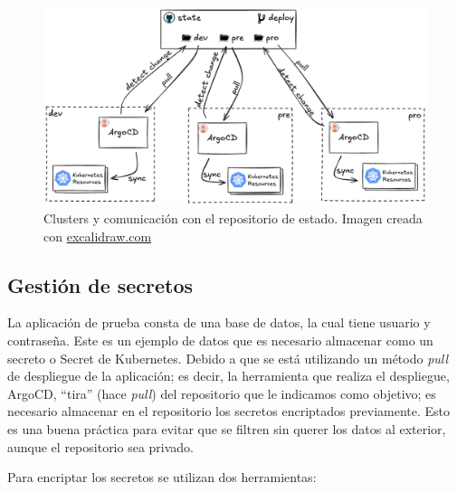 \begin{figure}
  \centerline{\includegraphics[width=15cm]{figuras/clusters}}
  \caption{Clusters y comunicación con el repositorio de estado. Imagen creada con \href{https://excalidraw.com}{excalidraw.com}}
  \label{fig:clusters}
\end{figure}

\subsection*{Gestión de secretos}
\label{subsec:secretos}

La aplicación de prueba consta de una base de datos, la cual tiene usuario y contraseña. Este es un ejemplo de datos que es necesario almacenar como un secreto o Secret de Kubernetes. Debido a que se está utilizando un método \textit{pull}\cite{pull} de despliegue de la aplicación; es decir, la herramienta que realiza el despliegue, ArgoCD, ``tira'' (hace \textit{pull}) del repositorio que le indicamos como objetivo; es necesario almacenar en el repositorio los secretos encriptados previamente. Esto es una buena práctica para evitar que se filtren sin querer los datos al exterior, aunque el repositorio sea privado.

Para encriptar los secretos se utilizan dos herramientas:

